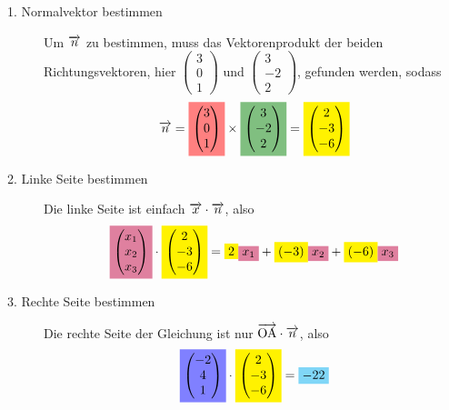 \documentclass{article}
\begin{document}
\begin{description}
 \item[1. Normalvektor bestimmen] Um $\overrightarrow{n}$ zu bestimmen, muss das Vektorenprodukt der beiden Richtungsvektoren, hier \colorbox{red!50}{$\begin{pmatrix} 3 \\ 0 \\ 1 \end{pmatrix}$} und \colorbox{green!50!black!50}{$\begin{pmatrix} 3 \\ -2 \\ 2 \end{pmatrix}$}, gefunden werden, sodass
 \begin{equation}
  \vect{n} =
   \colorbox{red!50}{$\begin{pmatrix} 3 \\ 0 \\ 1 \end{pmatrix}$}
   \times \colorbox{green!50!black!50}{$\begin{pmatrix} 3 \\ -2 \\ 2 \end{pmatrix}$}
   = \colorbox{yellow}{$\begin{pmatrix} 2 \\ -3 \\ -6 \end{pmatrix}$}
 \end{equation}
 
 \item[2. Linke Seite bestimmen] Die linke Seite ist einfach $\overrightarrow{x} \cdot \overrightarrow{n}$, also
 \begin{equation}
  \colorbox{purple!50}{$\begin{pmatrix} x_1 \\ x_2 \\ x_3 \end{pmatrix}$}
  \cdot \colorbox{yellow}{$\begin{pmatrix} 2 \\ -3 \\ -6 \end{pmatrix}$}
  = \colorbox{yellow}{$2$} \colorbox{purple!50}{$x_1$} +
  \colorbox{yellow}{$(-3)$} \colorbox{purple!50}{$x_2$} +
  \colorbox{yellow}{$(-6)$} \colorbox{purple!50}{$x_3$}
 \end{equation}
 
 \item[3. Rechte Seite bestimmen] Die rechte Seite der Gleichung ist nur $\overrightarrow{\mathrm{OA}} \cdot \overrightarrow{n}$, also
 \begin{equation}
  \colorbox{blue!50}{$\begin{pmatrix} -2 \\ 4 \\ 1 \end{pmatrix}$}
  \cdot \colorbox{yellow}{$\begin{pmatrix} 2 \\ -3 \\ -6 \end{pmatrix}$}
  = \colorbox{cyan!50}{$-22$}
 \end{equation} 
\end{description} 
\end{document}
